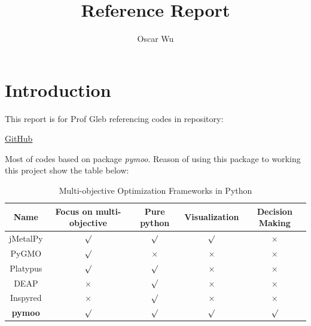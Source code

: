 \documentclass{article}
\author{Oscar Wu}
\date{}
\title{Reference Report}
\begin{document}
\bf{\maketitle}

\section{Introduction}
This report is for Prof Gleb referencing codes in repository: 
\begin{center}
\href{https://github.com/wuyoscar/MOOP}{GitHub}   
\end{center}

\noindent Most of codes based on package \emph{pymoo}. Reason of using this package to working this project show the table below:
\begin{table}[h]
	\caption{Multi-objective Optimization Frameworks in Python}
		\begin{center}
			\begin{tabular}{|c|c|c|c|c|}
			\hline 
			Name & Focus on multi-objective & Pure python &Visualization & Decision Making \\
			\hline 
			jMetalPy & $\surd$ & $\surd$ & $\surd$  & $\times $  \\
            \hline 
			PyGMO & $\surd$ & $\times$ & $\times$  & $\times $  \\
            \hline 
			Platypus & $\surd$ & $\surd$ & $\times$  & $\times $  \\
            \hline 
			DEAP & $\times$ & $\surd$ & $\times$  & $\times $  \\
            \hline 
			Inspyred & $\times$ & $\surd$ & $\times$  & $\times $  \\
            \hline 
			\bf{pymoo} & $\surd$ & $\surd$ & $\surd$  & $\surd $  \\

            \hline
			\end{tabular}
		\end{center}
	\end{table}
\end{document}
